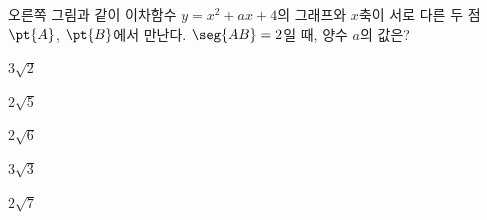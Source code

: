 \noindent\begin{minipage}[t]{0.58\linewidth}\vspace{0pt}\raggedright 오른쪽 그림과 같이 이차함수 $y=x^2+ax+4$의 그래프와 $x$축이 서로 다른 두 점~$\pt{A}$, $\pt{B}$에서 만난다. $\seg{AB}=2$일 때, 양수 $a$의 값은?\end{minipage}\hfill\begin{minipage}[t]{0.4\linewidth}\vspace{0pt}\centering \resizebox{\ifdim\width>\linewidth\linewidth\else\width\fi}{!}{}\end{minipage}\par
\begin{choices32}{\rule[-3ex]{0pt}{8ex}$3\sqrt{2}$}{\rule[-3ex]{0pt}{8ex}$2\sqrt{5}$}{\rule[-3ex]{0pt}{8ex}$2\sqrt{6}$}{\rule[-3ex]{0pt}{8ex}$3\sqrt{3}$}{\rule[-3ex]{0pt}{8ex}$2\sqrt{7}$}\end{choices32}
